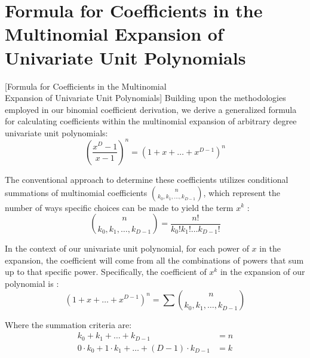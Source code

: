 \documentclass{article}
\theoremstyle{plain}
\theoremstyle{definition}
\begin{document}
\section{Formula for Coefficients in the Multinomial Expansion of Univariate Unit Polynomials}[Formula for Coefficients in the Multinomial\\Expansion of Univariate Unit Polynomials]
\label{sec:multinomialformula}
Building upon the methodologies employed in our binomial coefficient derivation, we derive a generalized formula for calculating coefficients within the multinomial expansion of arbitrary degree univariate unit polynomials:
\begin{equation}
    \left(\frac{x^{D}-1}{x-1}\right)^n = (1 + x + \ldots + x^{D-1})^n 
\end{equation}

The conventional approach to determine these coefficients utilizes conditional summations of multinomial coefficients \(\binom{n}{k_0, k_1, \ldots, k_{D-1}}\), which represent the number of ways specific choices can be made to yield the term \(x^k\) \cite{graham1994concrete}:
\begin{equation}
    \binom{n}{k_0, k_1, \ldots, k_{D-1}} = \frac{n!}{k_0! k_1! \ldots k_{D-1}!}
\end{equation}

In the context of our univariate unit polynomial, for each power of \(x\) in the expansion, the coefficient will come from all the combinations of powers that sum up to that specific power. Specifically, the coefficient of \(x^k\) in the expansion of our polynomial is \cite{brualdi2010intro}:
\begin{equation}
    [x^k](1 + x + \ldots + x^{D-1})^n = \sum \binom{n}{k_0, k_1, \ldots, k_{D-1}}
\end{equation}

Where the summation criteria are:
\begin{align}
    k_0 + k_1 + \ldots + k_{D-1} &= n \\
    0 \cdot k_0 + 1 \cdot k_1 + \ldots + (D-1) \cdot k_{D-1} &= k
\end{align}
\end{document}
